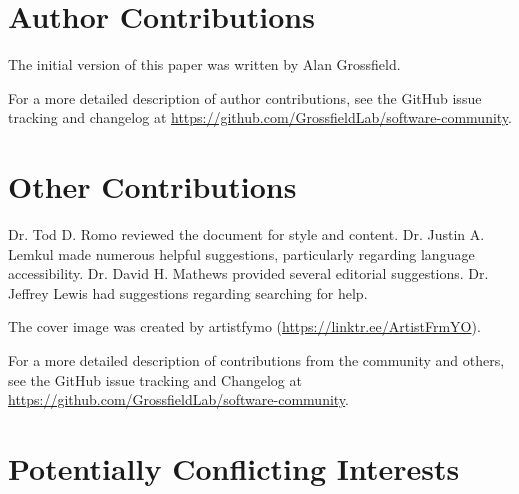 \documentclass[9pt,training,ASAPversion]{livecoms}
\newcommand{\githubrepository}{\url{https://github.com/GrossfieldLab/software-community}}
\begin{document}
\section{Author Contributions}
%
The initial version of this paper was written by Alan Grossfield.


For a more detailed description of author contributions,
see the GitHub issue tracking and changelog at \githubrepository.

\section{Other Contributions}
%
Dr. Tod D. Romo reviewed the document for style and content. Dr. Justin A.
Lemkul made numerous helpful suggestions, particularly regarding language
accessibility. Dr. David H. Mathews provided several editorial suggestions. Dr.
Jeffrey Lewis had suggestions regarding searching for help.

The cover image was created by artistfymo (\url{https://linktr.ee/ArtistFrmYO}).

For a more detailed description of contributions from the community and others, see the GitHub issue tracking and Changelog at \githubrepository.

\section{Potentially Conflicting Interests}
\end{document}
